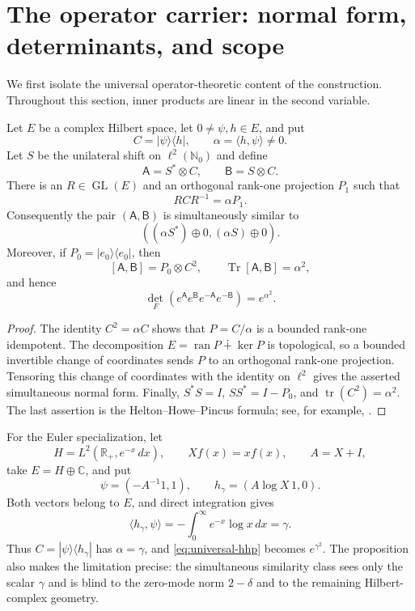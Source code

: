 
\section{The operator carrier: normal form, determinants, and scope}

We first isolate the universal operator-theoretic content of the construction.
Throughout this section, inner products are linear in the second variable.

\begin{proposition}\label{prop:rank-one-collapse}
Let $E$ be a complex Hilbert space, let $0\ne\psi,h\in E$, and put
\[
 C=|\psi\rangle\langle h|,
 \qquad \alpha=\langle h,\psi\rangle\ne0.
\]
Let $S$ be the unilateral shift on $\ell^2(\mathbb N_0)$ and define
\[
 \mathsf A=S^*\otimes C,
 \qquad
 \mathsf B=S\otimes C.
\]
There is an $R\in\operatorname{GL}(E)$ and an orthogonal rank-one
projection $P_1$ such that
\[
 RCR^{-1}=\alpha P_1.
\]
Consequently the pair $(\mathsf A,\mathsf B)$ is simultaneously similar to
\[
 ((\alpha S^*)\oplus0,(\alpha S)\oplus0).
\]
Moreover, if $P_0=|e_0\rangle\langle e_0|$, then
\[
 [\mathsf A,\mathsf B]=P_0\otimes C^2,
 \qquad
 \operatorname{Tr}[\mathsf A,\mathsf B]=\alpha^2,
\]
and hence
\begin{equation}\label{eq:universal-hhp}
 \det_F\!\left(
 e^{\mathsf A}e^{\mathsf B}e^{-\mathsf A}e^{-\mathsf B}
 \right)=e^{\alpha^2}.
\end{equation}
\end{proposition}

\begin{proof}
The identity $C^2=\alpha C$ shows that $P=C/\alpha$ is a bounded
rank-one idempotent.  The decomposition
$E=\operatorname{ran}P\dotplus\ker P$ is topological, so a bounded
invertible change of coordinates sends $P$ to an orthogonal rank-one
projection.  Tensoring this change of coordinates with the identity on
$\ell^2$ gives the asserted simultaneous normal form.  Finally,
$S^*S=I$, $SS^*=I-P_0$, and
$\operatorname{tr}(C^2)=\alpha^2$.  The last assertion is the
Helton--Howe--Pincus formula; see, for example, \cite{Migler2017}.
\end{proof}

For the Euler specialization, let
\[
 H=L^2(\mathbb R_+,e^{-x}\,dx),\qquad Xf(x)=xf(x),\qquad A=X+I,
\]
take $E=H\oplus\mathbb C$, and put
\[
 \psi=(-A^{-1}1,1),\qquad h_\gamma=(A\log X\,1,0).
\]
Both vectors belong to $E$, and direct integration gives
\[
 \langle h_\gamma,\psi\rangle
 =-\int_0^\infty e^{-x}\log x\,dx=\gamma.
\]
Thus $C=|\psi\rangle\langle h_\gamma|$ has $\alpha=\gamma$, and
\eqref{eq:universal-hhp} becomes $e^{\gamma^2}$.  The proposition also
makes the limitation precise: the simultaneous similarity class sees only
the scalar $\gamma$ and is blind to the zero-mode norm $2-\delta$ and to
the remaining Hilbert-complex geometry.

